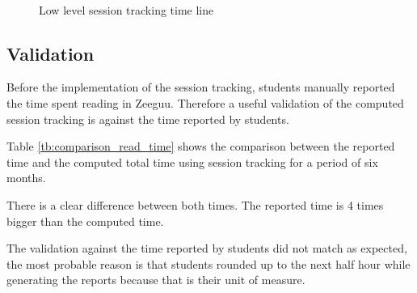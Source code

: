 \begin{figure}[!htb]
	\myfloatalign
	 \quad 
		
	 \\
	\caption{Low level session tracking time line}\label{fig:detailed_session_comparison}
\end{figure}


\subsection{Validation}
Before the implementation of the session tracking, students manually reported the time spent reading in Zeeguu. Therefore a useful validation of the computed session tracking is against the time reported by students.

Table \ref{tb:comparison_read_time} shows the comparison between the reported time and the computed total time using session tracking for a period of six months.

There is a clear difference between both times. The reported time is 4 times bigger than the computed time.

The validation against the time reported by students did not match as expected, the most probable reason is that students rounded up to the next half hour while generating the reports because that is their unit of measure. 

